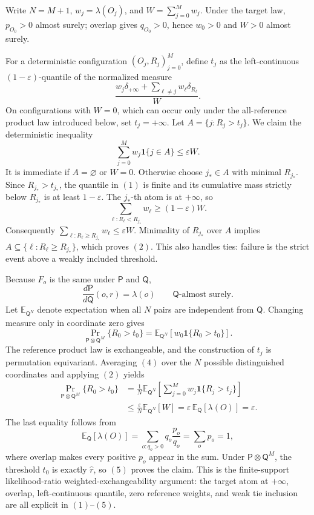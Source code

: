 Write \(N=M+1\), \(w_j=\lambda(O_j)\), and \(W=\sum_{j=0}^{M}w_j\). Under the target law, \(p_{O_0}>0\) almost surely; overlap gives \(q_{O_0}>0\), hence \(w_0>0\) and \(W>0\) almost surely.

For a deterministic configuration \((O_j,R_j)_{j=0}^{M}\), define \(t_j\) as the left-continuous \((1-\varepsilon)\)-quantile of the normalized measure
\[
\frac{w_j\delta_{+\infty}+\sum_{\ell\ne j}w_\ell\delta_{R_\ell}}{W}.\tag{1}
\]
On configurations with \(W=0\), which can occur only under the all-reference product law introduced below, set \(t_j=+\infty\). Let \(A=\{j:R_j>t_j\}\). We claim the deterministic inequality
\[
\sum_{j=0}^{M}w_j\mathbf 1\{j\in A\}\le\varepsilon W.\tag{2}
\]
It is immediate if \(A=\varnothing\) or \(W=0\). Otherwise choose \(j_*\in A\) with minimal \(R_{j_*}\). Since \(R_{j_*}>t_{j_*}\), the quantile in \((1)\) is finite and its cumulative mass strictly below \(R_{j_*}\) is at least \(1-\varepsilon\). The \(j_*\)-th atom is at \(+\infty\), so
\[
\sum_{\ell:R_\ell<R_{j_*}}w_\ell\ge(1-\varepsilon)W.
\]
Consequently \(\sum_{\ell:R_\ell\ge R_{j_*}}w_\ell\le\varepsilon W\). Minimality of \(R_{j_*}\) over \(A\) implies \(A\subseteq\{\ell:R_\ell\ge R_{j_*}\}\), which proves \((2)\). This also handles ties: failure is the strict event above a weakly included threshold.

Because \(F_o\) is the same under \(\mathsf P\) and \(\mathsf Q\),
\[
\frac{d\mathsf P}{d\mathsf Q}(o,r)=\lambda(o)\qquad\mathsf Q\text{-almost surely}.\tag{3}
\]
Let \(\mathbb E_{\mathsf Q^N}\) denote expectation when all \(N\) pairs are independent from \(\mathsf Q\). Changing measure only in coordinate zero gives
\[
\Pr_{\mathsf P\otimes\mathsf Q^M}\{R_0>t_0\}=\mathbb E_{\mathsf Q^N}\!\left[w_0\mathbf 1\{R_0>t_0\}\right].\tag{4}
\]
The reference product law is exchangeable, and the construction of \(t_j\) is permutation equivariant. Averaging \((4)\) over the \(N\) possible distinguished coordinates and applying \((2)\) yields
\[
\begin{aligned}
\Pr_{\mathsf P\otimes\mathsf Q^M}\{R_0>t_0\}&=\frac1N\mathbb E_{\mathsf Q^N}\!\left[\sum_{j=0}^{M}w_j\mathbf 1\{R_j>t_j\}\right]\\
&\le\frac{\varepsilon}{N}\mathbb E_{\mathsf Q^N}[W]
=\varepsilon\,\mathbb E_{\mathsf Q}[\lambda(O)]
=\varepsilon.
\end{aligned}\tag{5}
\]
The last equality follows from
\[
\mathbb E_{\mathsf Q}[\lambda(O)]=\sum_{o:q_o>0}q_o\frac{p_o}{q_o}=\sum_op_o=1,
\]
where overlap makes every positive \(p_o\) appear in the sum. Under \(\mathsf P\otimes\mathsf Q^M\), the threshold \(t_0\) is exactly \(\widehat r\), so \((5)\) proves the claim. This is the finite-support likelihood-ratio weighted-exchangeability argument: the target atom at \(+\infty\), overlap, left-continuous quantile, zero reference weights, and weak tie inclusion are all explicit in \((1)\)--\((5)\).